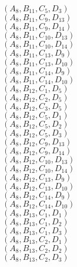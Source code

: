 \documentclass[14pt]{article}
\begin{document}
    $({A}_{8}, {B}_{11}, {C}_{5}, {D}_{3}) $ \\ 
    $({A}_{8}, {B}_{11}, {C}_{9}, {D}_{13}) $ \\ 
    $({A}_{8}, {B}_{11}, {C}_{9}, {D}_{14}) $ \\ 
    $({A}_{8}, {B}_{11}, {C}_{10}, {D}_{13}) $ \\ 
    $({A}_{8}, {B}_{11}, {C}_{10}, {D}_{14}) $ \\ 
    $({A}_{8}, {B}_{11}, {C}_{13}, {D}_{9}) $ \\ 
    $({A}_{8}, {B}_{11}, {C}_{13}, {D}_{10}) $ \\ 
    $({A}_{8}, {B}_{11}, {C}_{14}, {D}_{9}) $ \\ 
    $({A}_{8}, {B}_{11}, {C}_{14}, {D}_{10}) $ \\ 
    $({A}_{8}, {B}_{12}, {C}_{1}, {D}_{5}) $ \\ 
    $({A}_{8}, {B}_{12}, {C}_{2}, {D}_{5}) $ \\ 
    $({A}_{8}, {B}_{12}, {C}_{3}, {D}_{5}) $ \\ 
    $({A}_{8}, {B}_{12}, {C}_{5}, {D}_{1}) $ \\ 
    $({A}_{8}, {B}_{12}, {C}_{5}, {D}_{2}) $ \\ 
    $({A}_{8}, {B}_{12}, {C}_{5}, {D}_{3}) $ \\ 
    $({A}_{8}, {B}_{12}, {C}_{9}, {D}_{13}) $ \\ 
    $({A}_{8}, {B}_{12}, {C}_{9}, {D}_{14}) $ \\ 
    $({A}_{8}, {B}_{12}, {C}_{10}, {D}_{13}) $ \\ 
    $({A}_{8}, {B}_{12}, {C}_{10}, {D}_{14}) $ \\ 
    $({A}_{8}, {B}_{12}, {C}_{13}, {D}_{9}) $ \\ 
    $({A}_{8}, {B}_{12}, {C}_{13}, {D}_{10}) $ \\ 
    $({A}_{8}, {B}_{12}, {C}_{14}, {D}_{9}) $ \\ 
    $({A}_{8}, {B}_{12}, {C}_{14}, {D}_{10}) $ \\ 
    $({A}_{8}, {B}_{13}, {C}_{1}, {D}_{1}) $ \\ 
    $({A}_{8}, {B}_{13}, {C}_{1}, {D}_{2}) $ \\ 
    $({A}_{8}, {B}_{13}, {C}_{1}, {D}_{3}) $ \\ 
    $({A}_{8}, {B}_{13}, {C}_{2}, {D}_{1}) $ \\ 
    $({A}_{8}, {B}_{13}, {C}_{2}, {D}_{2}) $ \\ 
    $({A}_{8}, {B}_{13}, {C}_{2}, {D}_{3}) $ \\ 
\end{document}
